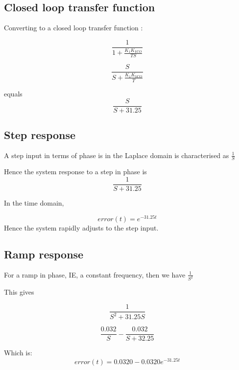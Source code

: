 \subsection{Closed loop transfer function}
Converting to a closed loop transfer function :

\begin{equation}
\frac{1}{1+\frac{K_1 K_{VCO}}{T S}}
\end{equation}


\begin{equation}
\frac{S}{S+\frac{K_1 K_{VCO}}{T}}
\end{equation}

equals 
\begin{equation}
\frac{S}{S+31.25}
\end{equation}

\subsection{Step response}
A step input in terms of phase is in the Laplace domain is characterised as  $\frac{1}{S}$

Hence the system response to a step in phase is
\begin{equation}
\frac{1}{S+31.25}
\end{equation}


In the time domain,

\begin{equation}
 error(t) =  e^{-31.25t}
\end{equation}
Hence the system rapidly adjusts to the step input. 

\subsection{Ramp response}

For a ramp in phase, IE, a constant frequency, then we have $\frac{1}{S^2}$

This gives 

\begin{equation}
\frac{1}{S^2+31.25S}
\end{equation}


\begin{equation}
\frac{0.032}{S} - \frac{0.032}{S+32.25} 
\end{equation}



Which is: 
\begin{equation}
error(t) =  0.0320 -0.0320e^{-31.25t}
\end{equation}

